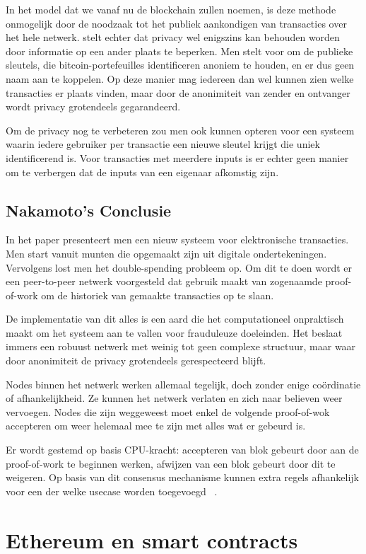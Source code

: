 	In het model dat we vanaf nu de blockchain zullen noemen, is deze methode onmogelijk door de noodzaak tot het publiek aankondigen van transacties over het hele netwerk.  \textcite{Nakamoto2008} stelt echter dat privacy wel enigszins kan behouden worden door informatie op een ander plaats te beperken. Men stelt voor om de publieke sleutels, die bitcoin-portefeuilles identificeren anoniem te houden, en er dus geen naam aan te koppelen. Op deze manier mag iedereen dan wel kunnen zien welke transacties er plaats vinden, maar door de anonimiteit van zender en ontvanger wordt privacy grotendeels gegarandeerd.
	
	Om de privacy nog te verbeteren zou men ook kunnen opteren voor een systeem waarin iedere gebruiker per transactie een nieuwe sleutel krijgt die uniek identificerend is. Voor transacties met meerdere inputs is er echter geen manier om te verbergen dat de inputs van een eigenaar afkomstig zijn.
	\subsection{Nakamoto’s Conclusie}
	In het paper presenteert men een nieuw systeem voor elektronische transacties. Men start vanuit munten die opgemaakt zijn uit digitale ondertekeningen. Vervolgens lost men het double-spending probleem op. Om dit te doen wordt er een peer-to-peer netwerk voorgesteld dat gebruik maakt van zogenaamde proof-of-work om de historiek van gemaakte transacties op te slaan. 
	
	De implementatie van dit alles is een aard die het computationeel onpraktisch maakt om het systeem aan te vallen voor frauduleuze doeleinden. Het beslaat immers een robuust netwerk met weinig tot geen complexe structuur, maar waar door anonimiteit de privacy grotendeels gerespecteerd blijft. 
	
	Nodes binnen het netwerk werken allemaal tegelijk, doch zonder enige coördinatie of afhankelijkheid. Ze kunnen het netwerk verlaten en zich naar believen weer vervoegen. Nodes die zijn weggeweest moet enkel de volgende proof-of-wok accepteren om weer helemaal mee te zijn met alles wat er gebeurd is. 
	
	Er wordt gestemd op basis CPU-kracht: accepteren van blok gebeurt door aan de proof-of-work te beginnen werken, afwijzen van een blok gebeurt door dit te weigeren. Op basis van dit consensus mechanisme kunnen extra regels afhankelijk voor een der welke usecase worden toegevoegd ~\autocite{Nakamoto2008}. 
\section{Ethereum en smart contracts}
\label{sec:ethereum-en-smart-contracts}
